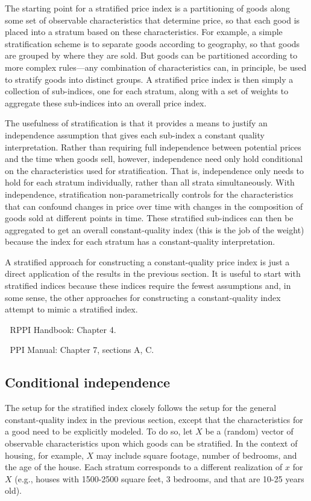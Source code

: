 \documentclass[]{article}
\begin{document}
The starting point for a stratified price index is a partitioning of goods along some set of observable characteristics that determine price, so that each good is placed into a stratum based on these characteristics. For example, a simple stratification scheme is to separate goods according to geography, so that goods are grouped by where they are sold. But goods can be partitioned according to more complex rules---any combination of characteristics can, in principle, be used to stratify goods into distinct groups. A stratified price index is then simply a collection of sub-indices, one for each stratum, along with a set of weights to aggregate these sub-indices into an overall price index.

The usefulness of stratification is that it provides a means to justify an independence assumption that gives each sub-index a constant quality interpretation. Rather than requiring full independence between potential prices and the time when goods sell, however, independence need only hold conditional on the characteristics used for stratification. That is, independence only needs to hold for each stratum individually, rather than all strata simultaneously. With independence, stratification non-parametrically controls for the characteristics that can confound changes in price over time with changes in the composition of goods sold at different points in time. These stratified sub-indices can then be aggregated to get an overall constant-quality index (this is the job of the weight) because the index for each stratum has a constant-quality interpretation.

A stratified approach for constructing a constant-quality price index is just a direct application of the results in the previous section. It is useful to start with stratified indices because these indices require the fewest assumptions and, in some sense, the other approaches for constructing a constant-quality index attempt to mimic a stratified index.

📖 RPPI Handbook: Chapter 4.

📖 PPI Manual: Chapter 7, sections A, C.

\hypertarget{conditional-independence}{%
\subsection{Conditional independence}\label{conditional-independence}}

The setup for the stratified index closely follows the setup for the general constant-quality index in the previous section, except that the characteristics for a good need to be explicitly modeled. To do so, let \(X\) be a (random) vector of observable characteristics upon which goods can be stratified. In the context of housing, for example, \(X\) may include square footage, number of bedrooms, and the age of the house. Each stratum corresponds to a different realization of \(x\) for \(X\) (e.g., houses with 1500-2500 square feet, 3 bedrooms, and that are 10-25 years old).
\end{document}

